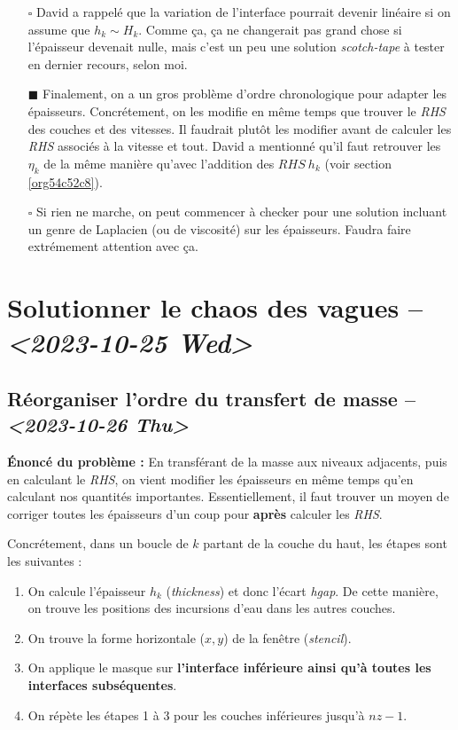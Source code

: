 \documentclass[10pt]{article}
\numberwithin{equation}{section}
\renewcommand{\boxtimes}{\blacksquare}
\begin{document}
\begin{itemize}
\item[{$\square$}] David a rappelé que la variation de l'interface pourrait devenir linéaire si on assume que \(h_k \sim H_k\).
Comme ça, ça ne changerait pas grand chose si l'épaisseur devenait nulle, mais c'est un peu une solution \emph{scotch-tape} à tester en dernier recours, selon moi.\bigskip

\item[{$\boxtimes$}] Finalement, on a un gros problème d'ordre chronologique pour adapter les épaisseurs.
Concrétement, on les modifie en même temps que trouver le \emph{RHS} des couches et des vitesses.
Il faudrait plutôt les modifier avant de calculer les \emph{RHS} associés à la vitesse et tout.
David a mentionné qu'il faut retrouver les \(\eta_k\) de la même manière qu'avec l'addition des \(RHS\ h_k\) (voir section \ref{org54c52c8}). \bigskip

\item[{$\square$}] Si rien ne marche, on peut commencer à checker pour une solution incluant un genre de Laplacien (ou de viscosité) sur les épaisseurs.
Faudra faire extrémement attention avec ça.
\end{itemize}
\section{Solutionner le chaos des vagues -- \textit{<2023-10-25 Wed>}}
\label{sec:orgc8cebae}

\subsection{Réorganiser l'ordre du transfert de masse -- \textit{<2023-10-26 Thu>}}
\label{sec:orge57b315}
\label{org54c52c8}
\textbf{Énoncé du problème :} En transférant de la masse aux niveaux adjacents, puis en calculant le \emph{RHS}, on vient modifier les épaisseurs en même temps qu'en calculant nos quantités importantes.
Essentiellement, il faut trouver un moyen de corriger toutes les épaisseurs d'un coup pour \textbf{après} calculer les \emph{RHS}. \bigskip

Concrétement, dans un boucle de \(k\) partant de la couche du haut, les étapes sont les suivantes :
\begin{enumerate}
\item On calcule l'épaisseur \(h_k\) (\emph{thickness}) et donc l'écart \emph{hgap}.
De cette manière, on trouve les positions des incursions d'eau dans les autres couches.
\item On trouve la forme horizontale (\(x,y\)) de la fenêtre (\emph{stencil}).
\item On applique le masque sur \textbf{l'interface inférieure ainsi qu'à toutes les interfaces subséquentes}.
\item On répète les étapes 1 à 3 pour les couches inférieures jusqu'à \(nz-1\).\bigskip
\end{enumerate}
\end{document}
